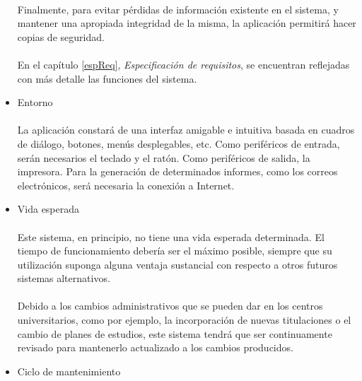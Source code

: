 \begin{itemize}
   \paragraph{}Finalmente, para evitar pérdidas de información existente
   en el sistema, y mantener una apropiada integridad de la misma, la aplicación
   permitirá hacer copias de seguridad.

   \paragraph{}En el capítulo \ref{espReq}, \textit{Especificación de
   requisitos}, se encuentran reflejadas con más detalle las funciones del
   sistema.

 \item Entorno

   \paragraph{}La aplicación constará de una interfaz amigable e
   intuitiva basada en cuadros de diálogo, botones, menús desplegables, etc.
   Como periféricos de entrada, serán necesarios el teclado y el ratón. Como
   periféricos de salida, la impresora. Para la generación de determinados
   informes, como los correos electrónicos, será necesaria la conexión a
   Internet.

 \item Vida esperada

   \paragraph{}Este sistema, en principio, no tiene una vida esperada
   determinada. El tiempo de funcionamiento debería ser el máximo posible,
   siempre que su utilización suponga alguna ventaja sustancial con respecto a
   otros futuros sistemas alternativos.

   \paragraph{}Debido a los cambios administrativos que se pueden dar en los
   centros universitarios, como por ejemplo, la incorporación de nuevas
   titulaciones o el cambio de planes de estudios, este sistema tendrá que ser
   continuamente revisado para mantenerlo actualizado a los cambios producidos.

 \item Ciclo de mantenimiento


\end{itemize}
